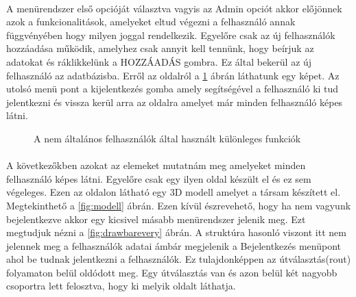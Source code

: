 \documentclass{article}
\begin{document}
	\paragraph{}
	A menürendszer első opcióját választva vagyis az Admin opciót akkor előjönnek azok a funkcionalitások, amelyeket eltud végezni a felhasználó annak függvényében hogy milyen joggal rendelkezik. Egyelőre csak az új felhasználók hozzáadása működik, amelyhez csak annyit kell tennünk, hogy beírjuk az adatokat és ráklikkelünk a HOZZÁADÁS gombra. Ez által bekerül az új felhasználó az adatbázisba. Erről az oldalról a \ref{fig:admin} ábrán láthatunk egy képet. Az utolsó menü pont a kijelentkezés gomba amely segítségével a felhasználó ki  tud jelentkezni és vissza kerül arra az oldalra amelyet már minden felhasználó képes látni.
	\begin{figure}
		\centering
		\caption{A nem általános felhasználók által használt különleges funkciók}
		\label{fig:admin}
	\end{figure}
	
	\paragraph{}
	A következőkben azokat az elemeket mutatnám meg amelyeket minden felhasználó képes látni. Egyelőre csak egy ilyen oldal készült el és ez sem végeleges. Ezen az oldalon látható egy 3D modell amelyet a társam készített el. Megtekinthető a \ref{fig:modell} ábrán. Ezen kívül észrevehető, hogy ha nem vagyunk bejelentkezve akkor egy kicsivel másabb menürendszer jelenik meg. Ezt megtudjuk nézni a \ref{fig:drawbarevery} ábrán. A struktúra hasonló viszont itt nem jelennek meg a felhasználók adatai ámbár megjelenik a Bejelentkezés menüpont ahol be tudnak jelentkezni a felhasználók. Ez tulajdonképpen az útválasztás(rout) folyamaton belül oldódott meg. Egy útválasztás van és azon belül két nagyobb csoportra lett felosztva, hogy ki melyik oldalt láthatja. 
	
\end{document}
